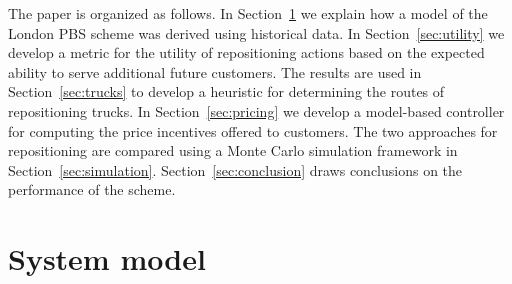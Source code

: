 \documentclass{article}
\begin{document}
The paper is organized as follows. In Section~\ref{sec:model} we explain how a
model of the London PBS scheme was derived using historical data. In
Section~\ref{sec:utility} we develop a metric for the utility of repositioning
actions based on the expected ability to serve additional future customers. The
results are used in Section~\ref{sec:trucks} to develop a heuristic for
determining the routes of repositioning trucks. In Section~\ref{sec:pricing} we
develop a model-based controller for computing the price incentives offered to
customers. The two approaches for repositioning are compared using a Monte Carlo
simulation framework in Section~\ref{sec:simulation}.
Section~\ref{sec:conclusion} draws conclusions on the performance of the scheme.

\section{System model}
\label{sec:model}
\end{document}

